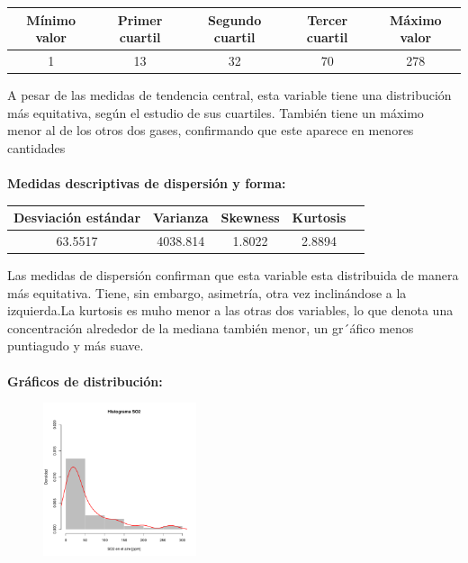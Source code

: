 \documentclass[11pt]{article}
\begin{document}
\begin{center}
\begin{tabular}{|c|c|c|c|c|}
    \hline
    Mínimo valor & Primer cuartil & Segundo cuartil & Tercer cuartil & Máximo valor\\ \hline
    1 & 13 & 32 & 70 & 278\\
    \hline
\end{tabular}
\end{center}

A pesar de las medidas de tendencia central, esta variable tiene una distribución más equitativa, según el estudio de sus cuartiles. También tiene un máximo menor al de los otros dos gases, confirmando que este aparece en menores cantidades
\\
\\
\textbf{Medidas descriptivas de dispersión y forma:}

\begin{center}
\begin{tabular}{|c|c|c|c|c|}
    \hline
    Desviación estándar  & Varianza & Skewness & Kurtosis\\ \hline
    63.5517 & 4038.814 & 1.8022 & 2.8894\\
    \hline
\end{tabular}
\end{center}

Las medidas de dispersión confirman que esta variable esta distribuida de manera más equitativa. Tiene, sin embargo, asimetría, otra vez inclinándose a la izquierda.La kurtosis es muho menor a las otras dos variables, lo que denota una concentración alrededor de la mediana también menor, un gr´áfico menos puntiagudo y más suave.
\\
\\
\textbf{Gráficos de distribución:}
\\

\begin{figure}
    \centering
    \includegraphics[width = 0.4\textwidth]{histso2}
\end{figure}
\end{document}
